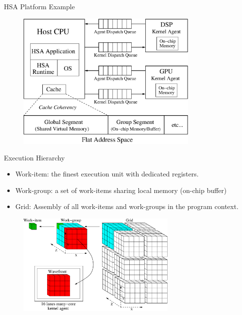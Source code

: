 \documentclass{beamer}
\begin{document}
\begin{CJK}{UTF8}{bkai}
    \begin{frame}{HSA Platform Example}
        \begin{figure}[!ht]
            \centering
            \includegraphics[width=0.8\textwidth]{./figs/systemspec.eps}
            \label{fig:systemspec}
        \end{figure}
    \end{frame}

    \begin{frame}{Execution Hierarchy}
        \begin{itemize}
            \item Work-item: the finest execution unit with dedicated registers.
            \item Work-group: a set of work-items sharing local memory (on-chip buffer)
            \item Grid: Assembly of all work-items and work-groups in the program context.
        \end{itemize}
        \begin{figure}[!ht] 
            \centering
            \includegraphics[width=0.7\textwidth]{./figs/grid.eps}
            \label{fig:grid}
        \end{figure}
    \end{frame}


\end{CJK}
\end{document}
